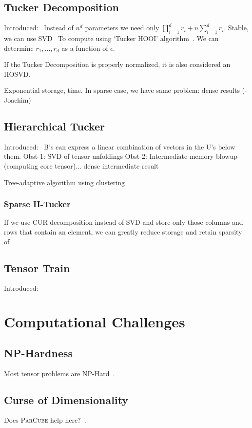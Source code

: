 \documentclass[leqno,onefignum,onetabnum]{siamltex1213}
\begin{document}
\subsection{Tucker Decomposition}
Introduced:~\cite{Tuck1966c}
Instead of $n^d$ parameters we need only $\prod_{i=1}^d r_i + n\sum_{i=1}^d r_i$.
Stable, we can use SVD~\cite{Lathauwer00amultilinear} To compute using `Tucker HOOI' algorithm~\cite{Lathauwer-THOOI}.
We can determine $r_1, \dots, r_d$ as a function of $\epsilon$.

If the Tucker Decomposition is properly normalized, it is also considered an HOSVD.

Exponential storage, time. In sparse case, we have same problem: dense results (-Joachim)
\subsection{Hierarchical Tucker}
Introduced:~\cite{Grasedyck:2010:HSV:1958286.1958311}
B's can express a linear combination of vectors in the U's below them.
Obst 1: SVD of tensor unfoldings
Obst 2: Intermediate memory blowup (computing core tensor)... dense intermediate result

Tree-adaptive algorithm using clustering~\cite{treeadap}

\subsubsection{Sparse H-Tucker}
If we use CUR decomposition instead of SVD and store only those columns and rows that contain an element, we can greatly reduce storage and retain sparsity of 

\subsection{Tensor Train}
Introduced:~\cite{Oseledets:2011:TD:2079141.2079149}
\section{Computational Challenges}
\subsection{NP-Hardness}
Most tensor problems are NP-Hard~\cite{Hillar}.

\subsection{Curse of Dimensionality}
Does \textsc{ParCube} help here?~\cite{PARCUBE}.
\end{document}
